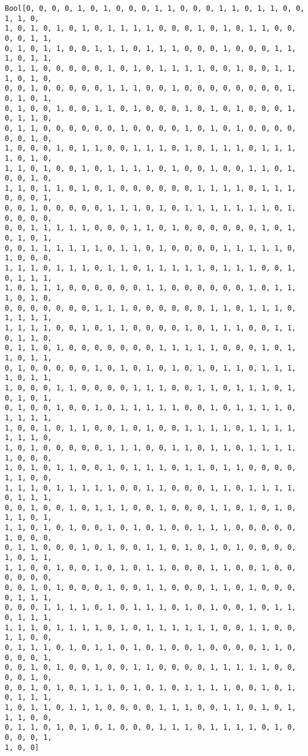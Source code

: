 \documentclass[11pt]{article}
\begin{document}
    \begin{Verbatim}[commandchars=\\\{\}]
Bool[0, 0, 0, 0, 1, 0, 1, 0, 0, 0, 1, 1, 0, 0, 0, 1, 1, 0, 1, 1, 0, 0, 1, 1, 0,
1, 0, 1, 0, 1, 0, 1, 0, 1, 1, 1, 1, 0, 0, 0, 1, 0, 1, 0, 1, 1, 0, 0, 0, 0, 1, 1,
0, 1, 0, 1, 1, 0, 0, 1, 1, 1, 0, 1, 1, 1, 0, 0, 0, 1, 0, 0, 0, 1, 1, 1, 0, 1, 1,
0, 1, 1, 0, 0, 0, 0, 0, 1, 0, 1, 0, 1, 1, 1, 1, 0, 0, 1, 0, 0, 1, 1, 1, 0, 1, 0,
0, 0, 1, 0, 0, 0, 0, 0, 1, 1, 1, 0, 0, 1, 0, 0, 0, 0, 0, 0, 0, 0, 1, 0, 1, 0, 1,
0, 1, 0, 0, 1, 0, 0, 1, 1, 0, 1, 0, 0, 0, 1, 0, 1, 0, 1, 0, 0, 0, 1, 0, 1, 1, 0,
0, 1, 1, 0, 0, 0, 0, 0, 0, 1, 0, 0, 0, 0, 1, 0, 1, 0, 1, 0, 0, 0, 0, 0, 0, 1, 0,
1, 0, 0, 0, 1, 0, 1, 1, 0, 0, 1, 1, 1, 0, 1, 0, 1, 1, 1, 0, 1, 1, 1, 1, 0, 1, 0,
1, 1, 0, 1, 0, 0, 1, 0, 1, 1, 1, 1, 0, 1, 0, 0, 1, 0, 0, 1, 1, 0, 1, 0, 0, 1, 0,
1, 1, 0, 1, 1, 0, 1, 0, 1, 0, 0, 0, 0, 0, 0, 1, 1, 1, 1, 0, 1, 1, 1, 0, 0, 0, 1,
0, 0, 1, 0, 0, 0, 0, 0, 1, 1, 1, 0, 1, 0, 1, 1, 1, 1, 1, 1, 1, 0, 1, 0, 0, 0, 0,
0, 0, 1, 1, 1, 1, 1, 0, 0, 0, 1, 1, 0, 1, 0, 0, 0, 0, 0, 0, 1, 0, 1, 0, 1, 0, 1,
0, 0, 1, 1, 1, 1, 1, 1, 0, 1, 1, 0, 1, 0, 0, 0, 0, 1, 1, 1, 1, 1, 0, 1, 0, 0, 0,
1, 1, 1, 0, 1, 1, 1, 0, 1, 1, 0, 1, 1, 1, 1, 1, 0, 1, 1, 1, 0, 0, 1, 0, 1, 1, 1,
1, 0, 1, 1, 1, 0, 0, 0, 0, 0, 0, 1, 1, 0, 0, 0, 0, 0, 0, 1, 0, 1, 1, 1, 0, 1, 0,
0, 0, 0, 0, 0, 0, 0, 1, 1, 1, 0, 0, 0, 0, 0, 0, 1, 1, 0, 1, 1, 1, 0, 1, 1, 1, 1,
1, 1, 1, 1, 0, 0, 1, 0, 1, 1, 0, 0, 0, 0, 1, 0, 1, 1, 1, 0, 0, 1, 1, 0, 1, 1, 0,
0, 1, 1, 0, 1, 0, 0, 0, 0, 0, 0, 0, 1, 1, 1, 1, 1, 0, 0, 0, 1, 0, 1, 1, 0, 1, 1,
0, 1, 0, 0, 0, 0, 0, 1, 0, 1, 0, 1, 0, 1, 0, 1, 0, 1, 1, 0, 1, 1, 1, 1, 0, 1, 1,
1, 0, 0, 0, 1, 1, 0, 0, 0, 0, 1, 1, 1, 0, 0, 1, 1, 0, 1, 1, 1, 0, 1, 0, 1, 0, 1,
0, 1, 0, 0, 1, 0, 0, 1, 0, 1, 1, 1, 1, 1, 0, 0, 1, 0, 1, 1, 1, 1, 0, 1, 1, 1, 1,
1, 0, 0, 1, 0, 1, 1, 0, 0, 1, 0, 1, 0, 0, 1, 1, 1, 1, 0, 1, 1, 1, 1, 1, 1, 1, 0,
1, 0, 1, 0, 0, 0, 0, 0, 1, 1, 1, 0, 0, 1, 1, 0, 1, 1, 0, 1, 1, 1, 1, 1, 0, 0, 0,
1, 0, 1, 0, 1, 1, 0, 0, 1, 0, 1, 1, 1, 0, 1, 1, 0, 1, 1, 0, 0, 0, 0, 1, 1, 0, 0,
1, 1, 1, 0, 1, 1, 1, 1, 1, 0, 0, 1, 1, 0, 0, 0, 1, 1, 0, 1, 1, 1, 1, 0, 1, 1, 1,
0, 0, 1, 0, 0, 1, 0, 1, 1, 1, 0, 0, 1, 0, 0, 0, 1, 1, 0, 1, 0, 1, 0, 1, 1, 0, 1,
1, 1, 0, 1, 0, 1, 0, 0, 1, 0, 1, 0, 1, 0, 0, 1, 1, 1, 0, 0, 0, 0, 0, 1, 0, 0, 0,
0, 1, 1, 0, 0, 0, 1, 0, 1, 0, 0, 1, 1, 0, 1, 0, 1, 0, 1, 0, 0, 0, 0, 1, 0, 1, 1,
1, 1, 0, 0, 1, 0, 0, 1, 0, 1, 0, 1, 1, 0, 0, 0, 1, 1, 0, 0, 1, 0, 0, 0, 0, 0, 0,
0, 0, 1, 0, 1, 0, 0, 0, 1, 0, 0, 1, 1, 0, 0, 0, 1, 1, 0, 1, 0, 0, 0, 0, 1, 1, 1,
0, 0, 0, 1, 1, 1, 1, 0, 1, 0, 1, 1, 1, 0, 1, 0, 1, 0, 0, 1, 0, 1, 1, 0, 1, 1, 1,
1, 1, 1, 0, 1, 1, 1, 1, 0, 1, 0, 1, 1, 1, 1, 1, 1, 0, 0, 1, 1, 0, 0, 1, 1, 0, 0,
0, 1, 1, 1, 0, 1, 0, 1, 1, 0, 1, 0, 1, 0, 0, 1, 0, 0, 0, 0, 1, 1, 0, 0, 0, 0, 1,
0, 0, 1, 0, 1, 0, 0, 1, 0, 0, 1, 1, 0, 0, 0, 0, 1, 1, 1, 1, 1, 0, 0, 0, 0, 1, 0,
0, 0, 1, 0, 1, 0, 1, 1, 1, 0, 1, 0, 1, 0, 1, 1, 1, 1, 0, 0, 1, 0, 1, 0, 1, 1, 1,
1, 0, 1, 1, 0, 1, 1, 1, 0, 0, 0, 0, 1, 1, 1, 0, 0, 1, 1, 0, 1, 0, 1, 1, 1, 0, 0,
0, 1, 1, 0, 1, 0, 1, 0, 1, 0, 0, 0, 1, 1, 1, 0, 1, 1, 1, 1, 0, 1, 0, 0, 0, 0, 1,
1, 0, 0]
    \end{Verbatim}
 
\end{document}
